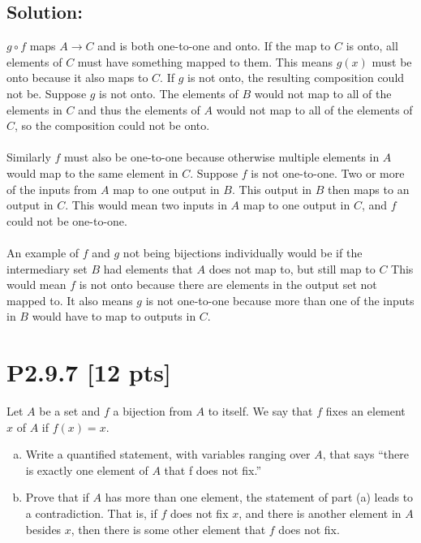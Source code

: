 \documentclass[12pt]{article}
\begin{document}
\subsection*{\textbf{Solution:}}
$g \circ f$ maps $A \rightarrow C$ and is both one-to-one and onto. If the map to $C$ is onto, all elements of $C$ must have something mapped to them. This means $g(x)$ must be onto because it also maps to $C$. If $g$ is not onto, the resulting composition could not be. Suppose $g$ is not onto. The elements of $B$ would not map to all of the elements in $C$ and thus the elements of $A$ would not map to all of the elements of $C$, so the composition could not be onto.\\\\
Similarly $f$ must also be one-to-one because otherwise multiple elements in $A$ would map to the same element in $C$. Suppose $f$ is not one-to-one. Two or more of the inputs from $A$ map to one output in $B$. This output in $B$ then maps to an output in $C$. This would mean two inputs in $A$ map to one output in $C$, and $f$ could not be one-to-one.\\\\
An example of $f$ and $g$ not being bijections individually would be if the intermediary set $B$ had elements that $A$ does not map to, but still map to $C$ This would mean $f$ is not onto because there are elements in the output set not mapped to. It also means $g$ is not one-to-one because more than one of the inputs in $B$ would have to map to outputs in $C$.



\newpage
\section*{\textbf{P2.9.7} [12 pts]}
Let $A$ be a set and $f$ a bijection from $A$ to itself. We say that $f$ fixes an element $x$ of $A$ if $f(x) = x$.

\begin{enumerate}[(a)]
    \item Write a quantified statement, with variables ranging over $A$, that says “there is exactly one element of $A$ that f does not fix.”

    \item Prove that if $A$ has more than one element, the statement of part (a) leads to a contradiction. That is, if $f$ does not fix $x$, and there is another element in $A$ besides $x$, then there is some other element that $f$ does not fix.
\end{enumerate}
\end{document}
